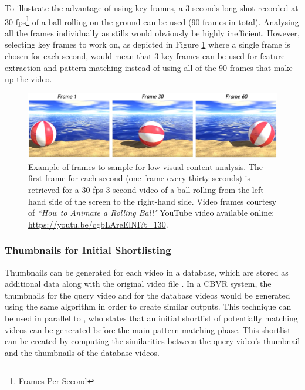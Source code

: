 To illustrate the advantage of using key frames, a 3-seconds long shot recorded at 30 fps\footnote{Frames Per Second} of a ball rolling on the ground can be used (90 frames in total). Analysing all the frames individually as stills would obviously be highly inefficient. However, selecting key frames to work on, as depicted in Figure \ref{fig:rolling_ball} where a single frame is chosen for each second, would mean that 3 key frames can be used for feature extraction and pattern matching instead of using all of the 90 frames that make up the video.\\

\begin{figure}[h]
\centerline{\includegraphics[width=\textwidth]{figures/litsurvey/ball_rolling.jpg}}
\caption{\label{fig:rolling_ball}Example of frames to sample for low-visual content analysis. The first frame for each second (one frame every thirty seconds) is retrieved for a 30 fps 3-second video of a ball rolling from the left-hand side of the screen to the right-hand side. Video frames courtesy of \textit{``How to Animate a Rolling Ball"} YouTube video available online: \url{https://youtu.be/cgbLAreElNI?t=130}.}
\end{figure}

\subsubsection{Thumbnails for Initial Shortlisting}

Thumbnails can be generated for each video in a database, which are stored as additional data along with the original video file \cite{okabe2018animating}. In a CBVR system, the thumbnails for the query video and for the database videos would be generated using the same algorithm in order to create similar outputs. This technique can be used in parallel to \cite{araujo2017i2v}, who states that an initial shortlist of potentially matching videos can be generated before the main pattern matching phase. This shortlist can be created by computing the similarities between the query video's thumbnail and the thumbnails of the database videos.\\

